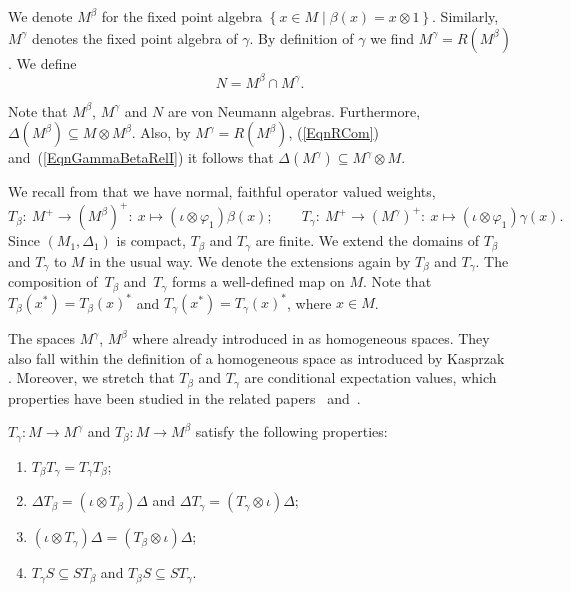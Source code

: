 \begin{dfn}
We denote $M^\beta$ for the f\/ixed point algebra $\left\{ x \in M \mid \beta(x) = x \otimes 1 \right\}$. Similarly, $M^\gamma$ denotes the f\/ixed point algebra of $\gamma$. By def\/inition of $\gamma$ we f\/ind $M^\gamma = R(M^\beta)$.  We def\/ine
\[
N = M^\beta \cap M^\gamma.
\]
\end{dfn}
Note that $M^\beta$, $M^\gamma$ and $N$ are von Neumann algebras. Furthermore, $\Delta( M^\beta) \subseteq M \otimes M^\beta$. Also, by $M^\gamma = R(M^\beta)$, (\ref{EqnRCom}) and~(\ref{EqnGammaBetaRelI}) it follows that $\Delta(M^\gamma) \subseteq M^\gamma \otimes M$.



We recall from \cite{VaeUni} that we have normal, faithful operator valued weights,
\[
 T_\beta: \  M^+ \rightarrow (M^{\beta})^{+}: \ x \mapsto (\iota \otimes \varphi_1) \beta(x);\qquad
 T_\gamma: \ M^+ \rightarrow (M^{\gamma})^{+}: \ x \mapsto (\iota \otimes \varphi_1) \gamma(x).
\]
Since $(M_1, \Delta_1)$ is compact, $T_\beta$ and $T_\gamma$ are f\/inite. We extend the domains of $T_\beta$ and $T_\gamma$ to $M$ in the usual way. We denote the extensions again by $T_\beta$ and $T_\gamma$. The composition of~$T_\beta$ and~$T_\gamma$ forms a well-def\/ined map on $M$. Note that $T_\beta(x^\ast) = T_\beta(x)^\ast$ and $T_\gamma(x^\ast) = T_\gamma(x)^\ast$, where $x \in M$.

\begin{rmk}
The spaces $M^\gamma$, $M^\beta$ where already introduced in \cite{VaeImp} as homogeneous spaces. They also fall within the def\/inition of a homogeneous space as introduced  by Kasprzak \cite[Remark~3.3]{Kas}. Moreover, we stretch that $T_\beta$ and $T_\gamma$ are conditional expectation values, which properties have been studied in the related papers~\cite{SalmiSkalski} and~\cite{Tomatsu}.
\end{rmk}


\begin{lem}\label{LemTProperties} $T_\gamma: M \rightarrow M^\gamma$ and $T_\beta: M \rightarrow M^\beta$ satisfy the following properties:
\begin{enumerate}\itemsep=0pt
\item\label{LemTI} $T_\beta T_\gamma = T_\gamma T_\beta $;
\item\label{LemTII} $\Delta  T_\beta = (\iota \otimes T_\beta) \Delta$ and  $\Delta T_\gamma = (T_\gamma \otimes \iota)  \Delta$;
\item\label{LemTIII} $(\iota \otimes T_\gamma)  \Delta = (T_\beta \otimes \iota)  \Delta$;
\item\label{LemTIV}  $T_\gamma S \subseteq S T_\beta$ and  $T_\beta S \subseteq S T_\gamma$.
\end{enumerate}
\end{lem}

